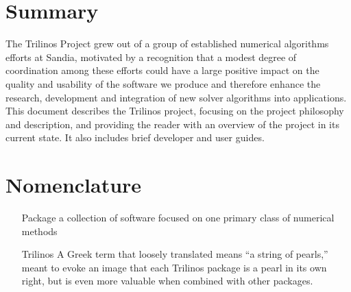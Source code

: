 \documentclass[12pt,strict]{SANDreport}
\begin{document}


    \clearpage
    \section{Summary}
The Trilinos Project grew out of a group of established numerical algorithms
efforts at Sandia, motivated by  a recognition that a modest degree of 
coordination among these efforts could have a large positive impact on the quality and
usability of the software we produce and therefore enhance the
research, development and integration of new solver algorithms into
applications.  This document describes the Trilinos project,
focusing on the project philosophy and description, and
providing the reader with an overview of the project in its current state.  It also
includes brief developer and user guides.


    \clearpage
    \section*{Nomenclature}
    \begin{itemize}
	\item[Package]
	    a collection of software focused on one primary class of numerical methods
	\item[Trilinos]
	    A Greek term that loosely translated means ``a string of pearls,'' meant
         to evoke an image that each Trilinos package is a pearl in its own right,
         but is even more valuable when combined with other packages.
    \end{itemize}


    \SANDmain		%
\end{document}
